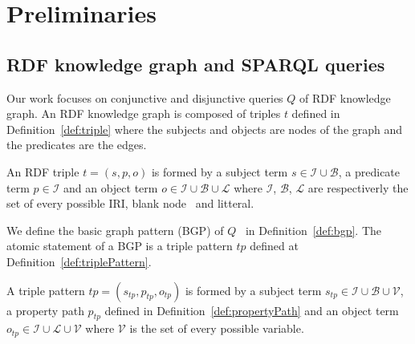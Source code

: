\section{Preliminaries}






\subsection{RDF knowledge graph and SPARQL queries}
Our work focuses on conjunctive and disjunctive queries $Q$ of RDF knowledge graph.
An RDF knowledge graph is composed of triples $t$ defined in Definition~\ref{def:triple} where the subjects and objects are nodes of the graph and the predicates are the edges.

\begin{definition}\label{def:triple}
    An RDF triple $t = (s,p,o)$ is formed by a subject term $s \in \mathcal{I} \cup \mathcal{B}$, a predicate term  $p \in \mathcal{I}$ and an object term $o \in \mathcal{I} \cup \mathcal{B} \cup \mathcal{L}$
    where $\mathcal{I}$, $\mathcal{B}$, $\mathcal{L}$ are respectiverly the set of every possible IRI, blank node~ and litteral.
\end{definition}

We define the basic graph pattern (BGP) of $Q$~ in Definition~\ref{def:bgp}.
The atomic statement of a BGP is a triple pattern $tp$ defined at Definition~\ref{def:triplePattern}.

\begin{definition}\label{def:triplePattern}
    A triple pattern $tp = (s_{tp},p_{tp},o_{tp})$ is formed by a subject term $s_{tp} \in \mathcal{I} \cup \mathcal{B} \cup \mathcal{V}$, 
    a property path  $p_{tp}$ defined in Definition~\ref{def:propertyPath} and an object term  $o_{tp} \in \mathcal{I} \cup \mathcal{L} \cup \mathcal{V}$ 
    where $\mathcal{V}$ is the set of every possible variable. 
\end{definition}

